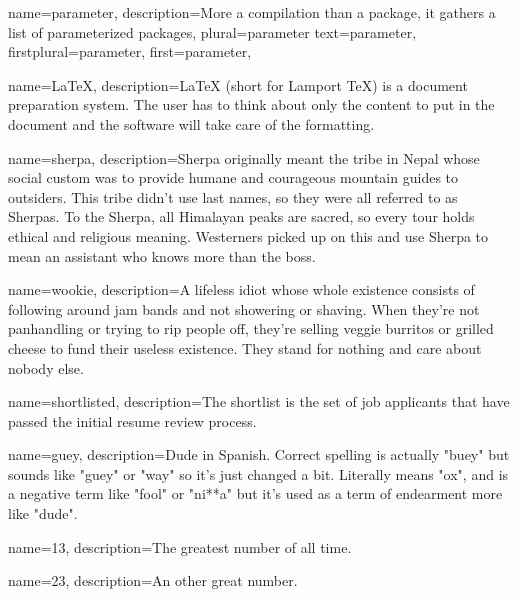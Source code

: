 {
    name={parameter}, %
    description={More a compilation than a package, it gathers a list of parameterized packages},
    plural={parameter}
    text={parameter}, %
    firstplural={parameter}, %
    first={parameter}, %
}

{
    name={\LaTeX},
    description={LaTeX (short for Lamport TeX) is a document preparation system. The user has
            to think about only the content to put in the document and the software will take care of the formatting.}
}

{
    name={sherpa},
    description={Sherpa originally meant the tribe in Nepal whose social custom was to provide humane and courageous
            mountain guides to outsiders. This tribe didn't use last names, so they were all referred to as Sherpas.
            To the Sherpa, all Himalayan peaks are sacred, so every tour holds ethical and religious meaning. Westerners
            picked up on this and use Sherpa to mean an assistant who knows more than the boss.}
}

{
    name={wookie},
    description={A lifeless idiot whose whole existence consists of following around jam bands and not
            showering or shaving. When they're not panhandling or trying to rip people off, they're selling veggie
            burritos or grilled cheese to fund their useless existence. They stand for nothing and care about nobody
            else.}
}

{
    name={shortlisted},
    description={The shortlist is the set of job applicants that have passed the initial resume review process.}
}

{
    name={guey},
    description={Dude in Spanish. Correct spelling is actually "buey" but sounds like "guey" or "way" so it's just
            changed a bit. Literally means "ox", and is a negative term like "fool" or "ni**a" but it's used as a term of
            endearment more like "dude".}
}

{
    name={13},
    description={The greatest number of all time.}
}

{
    name={23},
    description={An other great number.}
}
